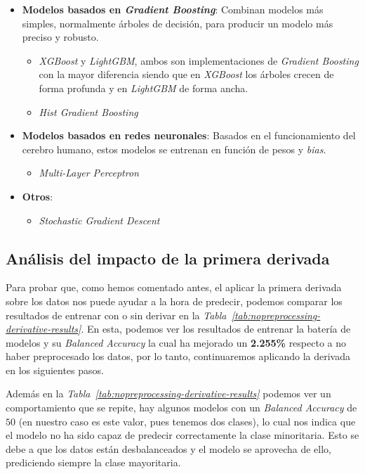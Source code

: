 \begin{itemize}
\begin{itemize}
        \end{itemize}
    \item \textbf{Modelos basados en \textit{Gradient Boosting}}: Combinan modelos más simples, normalmente árboles de decisión, para producir un modelo más preciso y robusto.\ \cite{Gradient97:online}
    \begin{itemize}
        \item \textit{XGBoost} y \textit{LightGBM}, ambos son implementaciones de \textit{Gradient Boosting} con la mayor diferencia siendo que en \textit{XGBoost} los árboles crecen de forma profunda y en \textit{LightGBM} de forma ancha. \cite{XGBoostv70:online}  
        \item \textit{Hist Gradient Boosting} 
    \end{itemize}
    \item \textbf{Modelos basados en redes neuronales}: Basados en el funcionamiento del cerebro humano, estos modelos se entrenan en función de pesos y \textit{bias}.
        \begin{itemize}
            \item \textit{Multi-Layer Perceptron}
        \end{itemize}
    \item \textbf{Otros}:
    \begin{itemize}
        \item \textit{Stochastic Gradient Descent}
    \end{itemize}
\end{itemize}

\subsection{Análisis del impacto de la primera derivada}

Para probar que, como hemos comentado antes, el aplicar la primera derivada sobre los datos nos puede ayudar a la hora de predecir, podemos comparar los resultados de entrenar con o sin derivar en la \textit{Tabla\ \ref{tab:nopreprocessing-derivative-results}}. En esta, podemos ver los resultados de entrenar la batería de modelos y su \textit{Balanced Accuracy} la cual ha mejorado un \textbf{2.255\%} respecto a no haber preprocesado los datos, por lo tanto, continuaremos aplicando la derivada en los siguientes pasos.

Además en la \textit{Tabla\ \ref{tab:nopreprocessing-derivative-results}} podemos ver un comportamiento que se repite, hay algunos modelos con un \textit{Balanced Accuracy} de $50$ (en nuestro caso es este valor, pues tenemos dos clases), lo cual nos indica que el modelo no ha sido capaz de predecir correctamente la clase minoritaria. Esto se debe a que los datos están desbalanceados y el modelo se aprovecha de ello, prediciendo siempre la clase mayoritaria.



